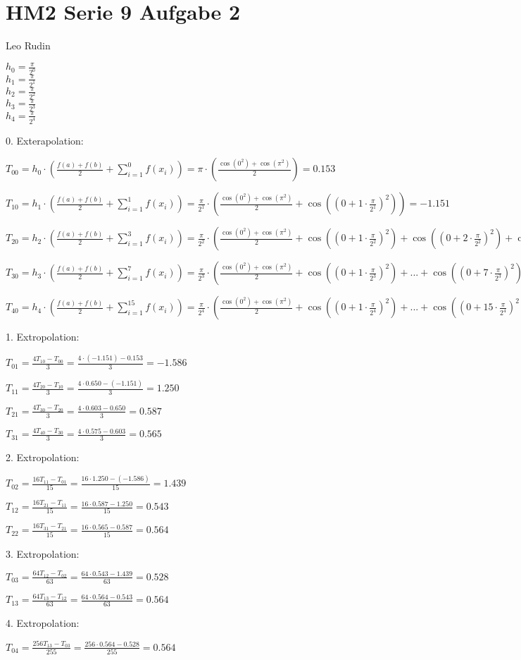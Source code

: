 \documentclass{article}
\begin{document}
\section*{HM2 Serie 9 Aufgabe 2}
Leo Rudin

\(h_0 = \frac{\pi}{2^0}\)\\
\(h_1 = \frac{\pi}{2^1}\)\\
\(h_2 = \frac{\pi}{2^2}\)\\
\(h_3 = \frac{\pi}{2^3}\)\\
\(h_4 = \frac{\pi}{2^4}\)

0. Exterapolation:

\(T_{00} = h_0 \cdot (\frac{f(a)+f(b)}{2} + \sum\limits_{i=1}^{0} f(x_i)) = \pi \cdot \left(\frac{\cos(0^2)+\cos(\pi^2)}{2}\right) = 0.153\)

\(T_{10} = h_1 \cdot (\frac{f(a)+f(b)}{2} + \sum\limits_{i=1}^{1} f(x_i)) = \frac{\pi}{2^1} \cdot \left(\frac{\cos(0^2)+\cos(\pi^2)}{2} + \cos((0+1\cdot\frac{\pi}{2^1})^2)\right) = -1.151\)

\(T_{20} = h_2 \cdot (\frac{f(a)+f(b)}{2} + \sum\limits_{i=1}^{3} f(x_i)) = \frac{\pi}{2^2} \cdot \left(\frac{\cos(0^2)+\cos(\pi^2)}{2} + \cos((0+1\cdot\frac{\pi}{2^2})^2) + \cos((0+2\cdot\frac{\pi}{2^2})^2) + \cos((0+3\cdot\frac{\pi}{2^2})^2)\right) = 0.650\)

\(T_{30} = h_3 \cdot (\frac{f(a)+f(b)}{2} + \sum\limits_{i=1}^{7} f(x_i)) = \frac{\pi}{2^3} \cdot \left(\frac{\cos(0^2)+\cos(\pi^2)}{2} + \cos((0+1\cdot\frac{\pi}{2^3})^2) + ... + \cos((0+7\cdot\frac{\pi}{2^3})^2)\right) = 0.603\)

\(T_{40} = h_4 \cdot (\frac{f(a)+f(b)}{2} + \sum\limits_{i=1}^{15} f(x_i)) = \frac{\pi}{2^4} \cdot \left(\frac{\cos(0^2)+\cos(\pi^2)}{2} + \cos((0+1\cdot\frac{\pi}{2^4})^2) + ... + \cos((0+15\cdot\frac{\pi}{2^4})^2)\right) = 0.575\)

1. Extropolation:

\(T_{01} = \frac{4T_{10}-T_{00}}{3} = \frac{4 \cdot (-1.151)-0.153}{3} = -1.586\)

\(T_{11} = \frac{4T_{20}-T_{10}}{3} = \frac{4 \cdot 0.650 - (-1.151)}{3} = 1.250\)

\(T_{21} = \frac{4T_{30}-T_{20}}{3} = \frac{4 \cdot 0.603-0.650}{3} = 0.587\)

\(T_{31} = \frac{4T_{40}-T_{30}}{3} = \frac{4 \cdot 0.575-0.603}{3} = 0.565\)

2. Extropolation:

\(T_{02} = \frac{16T_{11}-T_{01}}{15} = \frac{16 \cdot 1.250-(-1.586)}{15} = 1.439\)

\(T_{12} = \frac{16T_{21}-T_{11}}{15} = \frac{16 \cdot 0.587-1.250}{15} = 0.543\)

\(T_{22} = \frac{16T_{31}-T_{21}}{15} = \frac{16 \cdot 0.565-0.587}{15} = 0.564\)

3. Extropolation:

\(T_{03} = \frac{64T_{12}-T_{02}}{63} = \frac{64 \cdot 0.543-1.439}{63} = 0.528\)

\(T_{13} = \frac{64T_{13}-T_{12}}{63} = \frac{64 \cdot 0.564-0.543}{63} = 0.564\)

4. Extropolation:

\(T_{04} = \frac{256T_{13}-T_{03}}{255} = \frac{256 \cdot 0.564-0.528}{255} = 0.564\)
\end{document}

